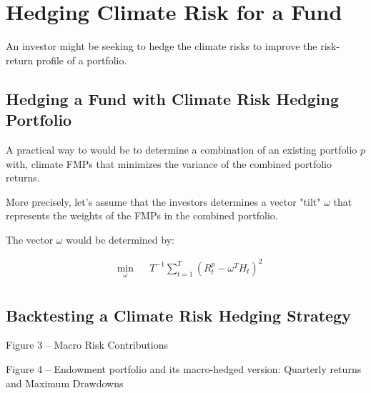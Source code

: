 \chapter{Hedging Climate Risk 
for a Fund}

An investor might be seeking to hedge 
the climate risks to improve 
the risk-return profile of a portfolio.

\section{Hedging a Fund with Climate 
Risk Hedging Portfolio}

A practical way to would be to determine 
a combination of an existing portfolio $p$ with,
climate FMPs that minimizes the variance of 
the combined portfolio returns.

More precisely, let's assume that the 
investors determines a vector "tilt" 
$\omega$ that represents the weights of
the FMPs in the combined portfolio.

The vector $\omega$ would be determined by:

\begin{equation}
    \begin{aligned}
        & \underset{\omega}{\min}
        & &   T^{-1} \sum^T_{t=1} (R^p_t - \omega^T H_t)^2\\
    \end{aligned}
\end{equation}


\section{Backtesting a Climate Risk Hedging Strategy}

Figure 3 – Macro Risk Contributions

Figure 4 – Endowment portfolio and its macro-hedged version:
Quarterly returns and Maximum Drawdowns